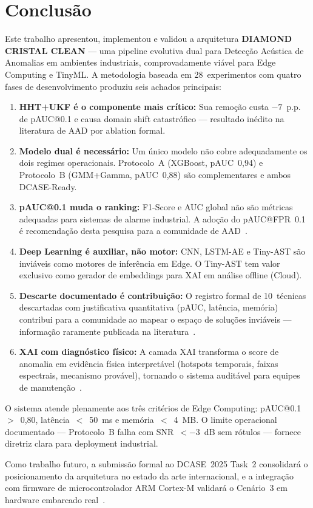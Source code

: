 \color{black}

\section{Conclusão}

Este trabalho apresentou, implementou e validou a arquitetura \textbf{DIAMOND CRISTAL CLEAN} --- uma
pipeline evolutiva dual para Detecção Acústica de Anomalias em ambientes industriais, comprovadamente
viável para Edge Computing e TinyML. A metodologia baseada em 28~experimentos com quatro fases de
desenvolvimento produziu seis achados principais:

\begin{enumerate}
    \item \textbf{HHT+UKF é o componente mais crítico:} Sua remoção custa $-7$~p.p. de pAUC@0.1 e
    causa domain shift catastrófico --- resultado inédito na literatura de AAD por ablation formal.

    \item \textbf{Modelo dual é necessário:} Um único modelo não cobre adequadamente os dois regimes
    operacionais. Protocolo~A (XGBoost, pAUC~0,94) e Protocolo~B (GMM+Gamma, pAUC~0,88) são
    complementares e ambos DCASE-Ready.

    \item \textbf{pAUC@0.1 muda o ranking:} F1-Score e AUC global não são métricas adequadas para
    sistemas de alarme industrial. A adoção do pAUC@FPR~0.1 é recomendação desta pesquisa para a
    comunidade de AAD~\cite{Nishida2025}.

    \item \textbf{Deep Learning é auxiliar, não motor:} CNN, LSTM-AE e Tiny-AST são inviáveis como
    motores de inferência em Edge. O Tiny-AST tem valor exclusivo como gerador de embeddings para XAI
    em análise offline (Cloud).

    \item \textbf{Descarte documentado é contribuição:} O registro formal de 10~técnicas descartadas
    com justificativa quantitativa (pAUC, latência, memória) contribui para a comunidade ao mapear o
    espaço de soluções inviáveis --- informação raramente publicada na literatura~\cite{Khamaisi2025}.

    \item \textbf{XAI com diagnóstico físico:} A camada XAI transforma o score de anomalia em
    evidência física interpretável (hotspots temporais, faixas espectrais, mecanismo provável),
    tornando o sistema auditável para equipes de manutenção~\cite{Ali2025, Zamorano2025}.
\end{enumerate}

O sistema atende plenamente aos três critérios de Edge Computing: pAUC@0.1~$>$~0,80, latência~$<$~50~ms
e memória~$<$~4~MB. O limite operacional documentado --- Protocolo~B falha com SNR~$<-3$~dB sem rótulos
--- fornece diretriz clara para deployment industrial.

Como trabalho futuro, a submissão formal ao DCASE~2025 Task~2 consolidará o posicionamento da
arquitetura no estado da arte internacional, e a integração com firmware de microcontrolador ARM
Cortex-M validará o Cenário~3 em hardware embarcado real~\cite{Uzel2026}.

\color{black}
